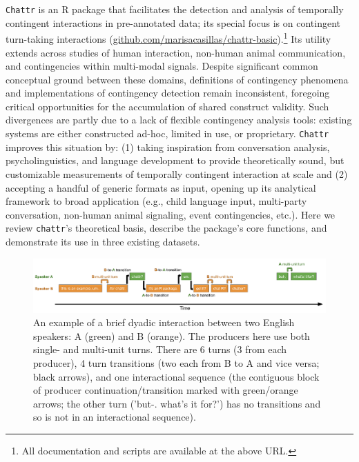 \documentclass[10pt, letterpaper]{article}
\newenvironment{CodeChunk}{}{}
\begin{document}
\texttt{Chattr} is an R package that facilitates the detection and
analysis of temporally contingent interactions in pre-annotated data;
its special focus is on contingent turn-taking interactions
(\href{https://github.com/marisacasillas/chattr-basic}{github.com/marisacasillas/chattr-basic}).\footnote{All
  documentation and scripts are available at the above URL.} Its utility
extends across studies of human interaction, non-human animal
communication, and contingencies within multi-modal signals. Despite
significant common conceptual ground between these domains, definitions
of contingency phenomena and implementations of contingency detection
remain inconsistent, foregoing critical opportunities for the
accumulation of shared construct validity. Such divergences are partly
due to a lack of flexible contingency analysis tools: existing systems
are either constructed ad-hoc, limited in use, or proprietary.
\texttt{Chattr} improves this situation by: (1) taking inspiration from
conversation analysis, psycholinguistics, and language development to
provide theoretically sound, but customizable measurements of temporally
contingent interaction at scale and (2) accepting a handful of generic
formats as input, opening up its analytical framework to broad
application (e.g., child language input, multi-party conversation,
non-human animal signaling, event contingencies, etc.). Here we review
\texttt{chattr}'s theoretical basis, describe the package's core
functions, and demonstrate its use in three existing datasets.

\begin{CodeChunk}
\begin{figure}[h]

{\centering \includegraphics{figs/minisequence-1} 

}

\caption[An example of a brief dyadic interaction between two English speakers]{An example of a brief dyadic interaction between two English speakers: A (green) and B (orange). The producers here use both single- and multi-unit turns. There are 6 turns (3 from each producer), 4 turn transitions (two each from B to A and vice versa; black arrows), and one interactional sequence (the contiguous block of producer continuation/transition marked with green/orange arrows; the other turn ('but-. what's it for?') has no transitions and so is not in an interactional sequence).}\label{fig:minisequence}
\end{figure}
\end{CodeChunk}
\end{document}
